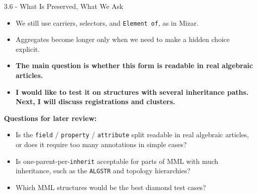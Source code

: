 \documentclass[aspectratio=169,11pt]{beamer}
\begin{document}
\begin{frame}[fragile,t]{3.6 - What Is Preserved, What We Ask}
\begin{itemize}
\setlength{\itemsep}{1pt}
\setlength{\parsep}{0pt}
\setlength{\parskip}{0pt}
\item We still use carriers, selectors, and \texttt{Element of}, as in Mizar.
\item Aggregates become longer only when we need to make a hidden choice explicit.
\item \textcolor{blue!55!black}{\textbf{The main question is whether this form is readable in real algebraic articles.}}
\item \textcolor{blue!55!black}{\textbf{I would like to test it on structures with several inheritance paths. Next, I will discuss registrations and clusters.}}
\end{itemize}
\smallskip
\textbf{Questions for later review:}
\begin{itemize}
\setlength{\itemsep}{1pt}
\setlength{\parsep}{0pt}
\setlength{\parskip}{0pt}
\item Is the \texttt{field} / \texttt{property} / \texttt{attribute} split readable in real algebraic articles, or does it require too many annotations in simple cases?
\item Is one-parent-per-\texttt{inherit} acceptable for parts of MML with much inheritance, such as the \texttt{ALGSTR} and topology hierarchies?
\item Which MML structures would be the best diamond test cases?
\end{itemize}
\end{frame}
\end{document}
